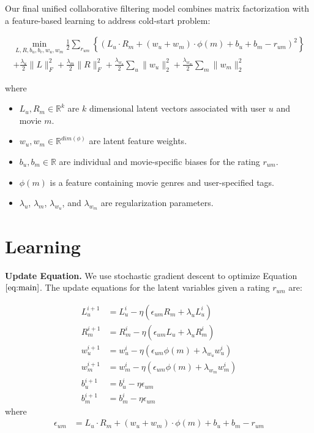 \documentclass{article} %
\begin{document}
Our final unified collaborative filtering model combines matrix
factorization with a feature-based learning to address cold-start problem:

\begin{multline}
\min_{L, R, b_u, b_v, w_u, w_m} \frac{1}{2}\sum_{r_{um}} \left\{(L_u \cdot R_m + (w_u + w_m) \cdot \phi(m) + b_u + b_m - r_{um})^2\right\}\\ + \frac{\lambda_u}{2}\|L\|^2_F + \frac{\lambda_m}{2}\|R\|^2_F + \frac{\lambda_{w_u}}{2}\sum_u\|w_u\|^2_2 + \frac{\lambda_{w_m}}{2}\sum_m\|w_m\|^2_2\label{eq:main}
\end{multline}

where
\begin{itemize}
	\item $L_u, R_m \in \mathbb{R}^k$ are $k$ dimensional latent vectors associated with user $u$ and movie $m$.
	\item $w_u,w_m \in \mathbb{R}^{dim(\phi)}$ are latent feature weights.
	\item $b_u, b_m \in \mathbb{R}$ are individual and movie-specific biases for the rating $r_{um}$.
	\item $\phi(m)$ is a feature containing movie genres and user-specified tags.
	\item $\lambda_u$, $\lambda_m$, $\lambda_{w_u}$, and $\lambda_{w_m}$ are regularization parameters.
\end{itemize}

\section{Learning}

\textbf{Update Equation.}   We use stochastic gradient descent to optimize
Equation $\ref{eq:main}$. The update equations for the latent variables given
a rating $r_{um}$ are:

\begin{align}
L_u^{i+1} &= L_u^{i} - \eta ( \epsilon_{um} R_m  + \lambda_u L_u^i)\\
R_m^{i+1} &= R_m^{i} - \eta ( \epsilon_{um} L_u  + \lambda_u R_m^i)\\
w_u^{i+1} &= w_u^{i} - \eta ( \epsilon_{um} \phi(m) + \lambda_{w_u} w_u^i)\\
w_m^{i+1} &= w_m^{i} - \eta ( \epsilon_{um} \phi(m) + \lambda_{w_m} w_m^i)\\
b_u^{i+1} &= b_u^{i} - \eta \epsilon_{um}\\
b_m^{i+1} &= b_m^{i} - \eta \epsilon_{um}
\end{align}
where
\begin{align}
	\epsilon_{um} &= L_u \cdot R_m + (w_u + w_m) \cdot \phi(m) + b_u + b_m - r_{um}
\end{align}
\end{document}
